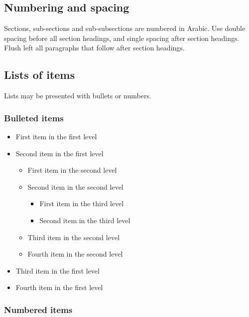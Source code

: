 \documentclass{ws-ijac}
\begin{document}
\subsection{Numbering and spacing}
Sections, sub-sections and sub-subsections are numbered in Arabic.
Use double spacing before all section headings, and single spacing
after section headings. Flush left all paragraphs that follow after
section headings.

\subsection{Lists of items}
Lists may be presented with bullets or numbers.

\subsubsection{Bulleted items}

\begin{itemize}
\item First item in the first level
\item Second item in the first level
\begin{itemize}
\item First item in the second level
\item Second item in the second level
\begin{itemize}
\item First item in the third level
\item Second item in the third level
\end{itemize}
\item Third item in the second level
\item Fourth item in the second level
\end{itemize}
\item Third item in the first level
\item Fourth item in the first level
\end{itemize}

\subsubsection{Numbered items}
\end{document}
